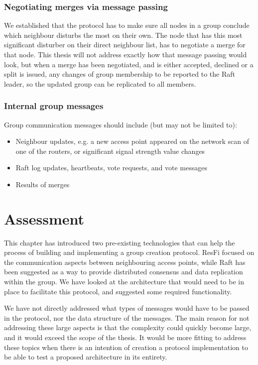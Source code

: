 \subsubsection{Negotiating merges via message passing}
We established that the protocol has to make sure all nodes in a group conclude which neighbour disturbs the most on their own.
The node that has this most significant disturber on their direct neighbour list, has to negotiate a merge for that node. 
This thesis will not address exactly how that message passing would look, but when a merge has been negotiated, and is either accepted, declined or a split is issued,
any changes of group membership to be reported to the Raft leader, so the updated group can be replicated to all members. 

\subsubsection{Internal group messages}
Group communication messages should include (but may not be limited to):
			\begin{itemize}
				\item Neighbour updates, e.g. a new access point appeared on the network scan of one of the routers, or significant signal strength value changes
				\item Raft log updates, heartbeats, vote requests, and vote messages
				\item Results of merges 
			\end{itemize}
				
\section{Assessment}
This chapter has introduced two pre-existing technologies that can help the process of building and implementing a group creation protocol. ResFi focused on the communication aspects between
neighbouring access points, while Raft has been suggested as a way to provide distributed consensus and data replication within the group. We have looked at the architecture that
would need to be in place to facilitate this protocol, and suggested some required functionality. 

We have not directly addressed what types of messages would have to be passed in the protocol, nor the data structure of the messages. The main reason for not addressing these large aspects is 
that the complexity could quickly become large, and it would exceed the scope of the thesis. It would be more fitting to address these topics when there is an intention of creation
a protocol implementation to be able to test a proposed architecture in its entirety.  

